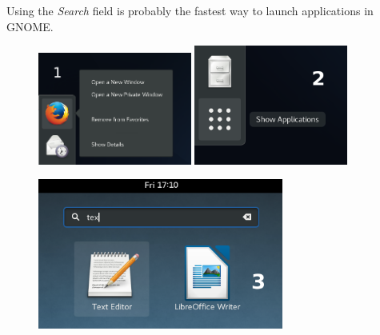 \begin{enumerate}
Using the \emph{Search} field is probably the fastest way to launch applications in GNOME.

\begin{figure}[t]
\begin{center}
\includegraphics[width=0.45\textwidth]{img/dash-b}
 \label{fig:dash-b}
\bigskip
\includegraphics[width=0.45\textwidth]{img/dash-a}
 \label{fig:dash-a}
\end{center}
\end{figure}


\begin{figure}[ht]
\begin{center}
\includegraphics[width=0.72\textwidth]{img/search}
 \label{fig:search}
\end{center}
\end{figure}


\end{enumerate}
